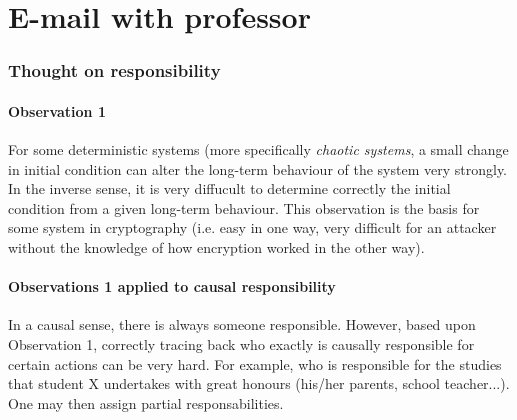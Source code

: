 \documentclass[../main/main.tex]{subfiles}
\begin{document}
\part{E-mail with professor}

\section{Thought on responsibility}

\subsection{Observation 1}
For some deterministic systems (more specifically \textit{chaotic systems}, a small change in initial condition can alter the long-term behaviour of the system very strongly. In the inverse sense, it is very diffucult to determine correctly the initial condition from a given long-term behaviour. This observation is the basis for some system in cryptography (i.e. easy in one way, very difficult for an attacker without the knowledge of how encryption worked in the other way).

\subsection{Observations 1 applied to causal responsibility}
\label{observation_causal_respo}
In a causal sense, there is always someone responsible. However, based upon Observation 1, correctly tracing back who exactly is causally responsible for certain actions can be very hard. For example, who is responsible for the studies that student X undertakes with great honours (his/her parents, school teacher...). One may then assign partial responsabilities. 
\end{document}
